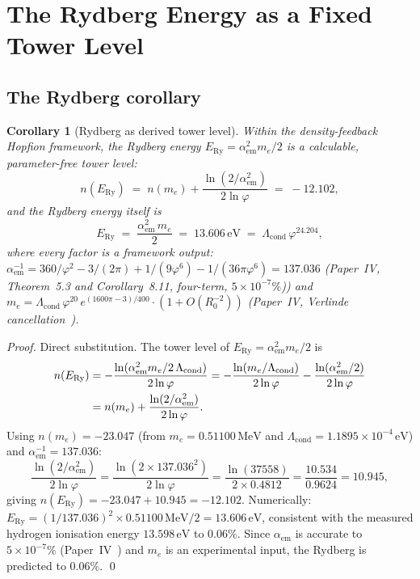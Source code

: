 \documentclass[11pt,a4paper]{article}
\newtheorem{corollary}[theorem]{Corollary}
\theoremstyle{definition}
\theoremstyle{remark}
\newcommand{\vp}{\varphi}
\newcommand{\Lcond}{\Lambda_{\mathrm{cond}}}
\newcommand{\ERy}{E_{\mathrm{Ry}}}
\newcommand{\aem}{\alpha_{\mathrm{em}}}
\newcommand{\nlvl}[1]{n\!\left(#1\right)}
\begin{document}
\section{The Rydberg Energy as a Fixed Tower Level}
\label{P11:sec:rydberg}

\subsection{The Rydberg corollary}

\begin{corollary}[Rydberg as derived tower level]
\label{P11:cor:rydberg}
Within the density-feedback Hopfion framework,
the Rydberg energy $\ERy = \aem^2 m_e/2$ is a
\emph{calculable, parameter-free} tower level:
\begin{equation}
  \boxed{\nlvl{\ERy}
  \;=\; n(m_e) + \frac{\ln(2/\aem^2)}{2\ln\vp}
  \;=\; -12.102},
  \label{P11:eq:nRy}
\end{equation}
and the Rydberg energy itself is
\begin{equation}
  \boxed{
    \ERy
    \;=\; \frac{\aem^2\,m_e}{2}
    \;=\; 13.606\,\mathrm{eV}
    \;=\; \Lcond\,\vp^{24.204},
  }
  \label{P11:eq:Ry_value}
\end{equation}
where every factor is a framework output:
$\aem^{-1} = 360/\vp^2 - 3/(2\pi) + 1/(9\vp^6) - 1/(36\pi\vp^6)= 137.036$
(Paper~IV, Theorem~5.3 and Corollary~8.11, four-term, $5\times10^{-7}\%$)) and
$m_e = \Lcond\,\vp^{20}\,e^{(1600\pi-3)/400}\cdot(1+O(R_0^{-2}))$
(Paper~IV, Verlinde cancellation~\cite{Paper4}).
\end{corollary}

\begin{proof}
Direct substitution.  The tower level of $\ERy = \aem^2 m_e/2$ is
\begin{align}
  \nlvl{\ERy}
  &= -\frac{\ln(\aem^2 m_e / 2\,\Lcond)}{2\ln\vp}
   = -\frac{\ln(m_e/\Lcond)}{2\ln\vp}
     -\frac{\ln(\aem^2/2)}{2\ln\vp} \notag\\
  &= n(m_e) + \frac{\ln(2/\aem^2)}{2\ln\vp}.
  \label{P11:eq:nRy_proof}
\end{align}
Using $n(m_e) = -23.047$ (from $m_e = 0.51100\,\mathrm{MeV}$
and $\Lcond = 1.1895\times10^{-4}\,\mathrm{eV}$) and
$\aem^{-1} = 137.036$:
\begin{equation}
  \frac{\ln(2/\aem^2)}{2\ln\vp}
  = \frac{\ln(2\times137.036^2)}{2\ln\vp}
  = \frac{\ln(37558)}{2\times0.4812}
  = \frac{10.534}{0.9624}
  = 10.945,
\end{equation}
giving $\nlvl{\ERy} = -23.047 + 10.945 = -12.102$.
Numerically: $\ERy = (1/137.036)^2\times 0.51100\,\mathrm{MeV}/2
= 13.606\,\mathrm{eV}$, consistent with the measured hydrogen
ionisation energy $13.598\,\mathrm{eV}$ to $0.06\%$.
Since $\aem$ is accurate to $5\times10^{-7}\%$ (Paper~IV~\cite{Paper4}) and $m_e$
is an experimental input, the Rydberg is predicted to $0.06\%$.
\qed
\end{proof}
\end{document}
